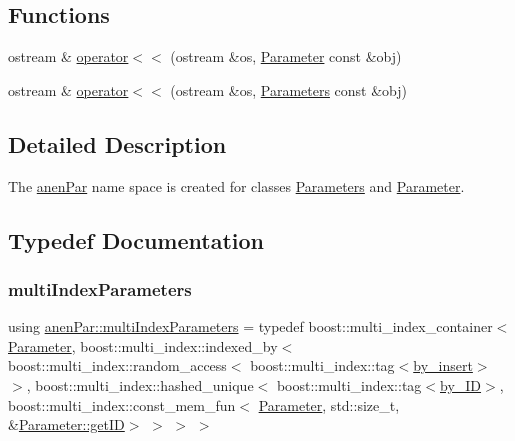 \subsection*{Functions}
\begin{DoxyCompactItemize}
\item 
ostream \& \mbox{\hyperlink{namespaceanen_par_a52a5a22e980d0d41a493b6cb3f5b0bb4}{operator$<$$<$}} (ostream \&os, \mbox{\hyperlink{classanen_par_1_1_parameter}{Parameter}} const \&obj)
\item 
ostream \& \mbox{\hyperlink{namespaceanen_par_a670cbfb557a503e08dd170516c81b075}{operator$<$$<$}} (ostream \&os, \mbox{\hyperlink{classanen_par_1_1_parameters}{Parameters}} const \&obj)
\end{DoxyCompactItemize}


\subsection{Detailed Description}
The \mbox{\hyperlink{namespaceanen_par}{anen\+Par}} name space is created for classes \mbox{\hyperlink{classanen_par_1_1_parameters}{Parameters}} and \mbox{\hyperlink{classanen_par_1_1_parameter}{Parameter}}. 

\subsection{Typedef Documentation}
\mbox{\label{namespaceanen_par_a80347e56535f3553dead0c9515dbecd6}} 
\subsubsection{\texorpdfstring{multi\+Index\+Parameters}{multiIndexParameters}}
{\footnotesize\ttfamily using \mbox{\hyperlink{namespaceanen_par_a80347e56535f3553dead0c9515dbecd6}{anen\+Par\+::multi\+Index\+Parameters}} = typedef boost\+::multi\+\_\+index\+\_\+container$<$ \mbox{\hyperlink{classanen_par_1_1_parameter}{Parameter}}, boost\+::multi\+\_\+index\+::indexed\+\_\+by$<$ boost\+::multi\+\_\+index\+::random\+\_\+access$<$ boost\+::multi\+\_\+index\+::tag$<$\mbox{\hyperlink{structanen_par_1_1by__insert}{by\+\_\+insert}}$>$ $>$, boost\+::multi\+\_\+index\+::hashed\+\_\+unique$<$ boost\+::multi\+\_\+index\+::tag$<$\mbox{\hyperlink{structanen_par_1_1by___i_d}{by\+\_\+\+ID}}$>$, boost\+::multi\+\_\+index\+::const\+\_\+mem\+\_\+fun$<$ \mbox{\hyperlink{classanen_par_1_1_parameter}{Parameter}}, std\+::size\+\_\+t, \&\mbox{\hyperlink{classanen_par_1_1_parameter_a5d98f6099de9e07686f44026a6926038}{Parameter\+::get\+ID}}$>$ $>$ $>$ $>$}

